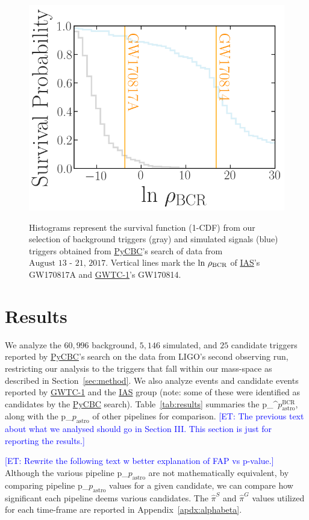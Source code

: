 \documentclass[%
 nofootinbib,
 amsmath,amssymb,
 aps,
 twocolumn,
 superscriptaddress
]{revtex4-2}
\newcommand{\pycbc}{{\sc \href{https://pycbc.org/}{{PyCBC}}}\xspace}
\newcommand{\GWTC}{{\sc \href{https://ui.adsabs.harvard.edu/abs/2019PhRvX...9c1040A/abstract}{{GWTC-1}}}\xspace}
\newcommand{\IAS}{{\sc \href{https://ui.adsabs.harvard.edu/abs/2020PhRvD.101h3030V/abstract}{{IAS}}}\xspace}
\newcommand{\fancytext}[1]{{\relax\ifmmode#1\else $#1$\fi}\xspace}
\newcommand{\mathcmd}[1]{{\sc \relax\ifmmode#1\else $#1$\fi}\xspace}
\newcommand{\bcr}{\mathcmd{\rho_\text{BCR}}}
\newcommand{\pastro}{\fancytext{p_\text{astro}}}
\newcommand{\pastrobcr}{\fancytext{p_\text{astro}^{\text{BCR}}}}
\newcommand{\et}[1]{\textcolor{blue}{[ET: #1]}}
\begin{document}
\begin{figure}[!ht]
{\centering \includegraphics[width=0.85\linewidth]{images/reweighted_bcr_cdf_smaller_legend.png} }
\caption[BCR distribution example]{Histograms represent the survival function (1-CDF) from our selection of background triggers (gray) and simulated signals (blue) triggers obtained from \pycbc's search of data from $\text{August 13 - 21, 2017}$. Vertical lines mark the $\text{ln}\ \bcr$ of \IAS's GW170817A and \GWTC's GW170814.}\label{fig:bcrCdf}
\end{figure}


\section{\label{sec:Results}Results}


We analyze the $60,996$ background, $5,146$ simulated, and $25$ candidate triggers reported by \pycbc's search on the data from LIGO's second observing run, restricting our analysis to the triggers that fall within our mass-space as described in Section~\ref{sec:method}. We also analyze events and candidate events reported by \GWTC and the \IAS group (note: some of these were identified as candidates by the \pycbc search). Table~\ref{tab:results} summaries the \pastrobcr, along with the \pastro of other pipelines for comparison. 
\et{The previous text about what we analysed should go in Section III. This section is just for reporting the results.}

\et{Rewrite the following text w better explanation of FAP vs p-value.}
Although the various pipeline \pastro are not mathematically equivalent, by comparing pipeline \pastro values for a given candidate, we can compare how significant each pipeline deems various candidates. The $\hat{\pi}^S$ and $\hat{\pi}^G$ values utilized for each time-frame are reported in Appendix~\ref{apdx:alphabeta}.
\end{document}
